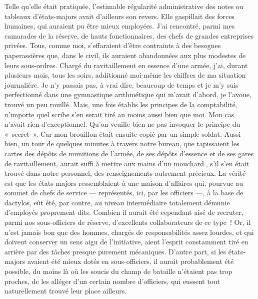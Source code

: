 \documentclass[french,twoside]{book} %
\begin{document}
Telle qu’elle était pratiquée, l’estimable régularité administrative des notes ou tableaux d’états-majors avait d’ailleurs son revers. Elle gaspillait des forces humaines, qui auraient pu être mieux employées. J’ai rencontré, parmi mes camarades de la réserve, de hauts fonctionnaires, des chefs de grandes entreprises privées. Tous, comme moi, s’effaraient d’être contraints à des besognes paperassières que, dans le civil, ils auraient abandonnées aux plus modestes de leurs sous-ordres. Chargé du ravitaillement en essence d’une armée, j’ai, durant plusieurs mois, tous les soirs, additionné moi-même les chiffres de ma situation journalière. Je n’y passais pas, à vrai dire, beaucoup de temps et je m’y suis perfectionné dans une gymnastique arithmétique qui m’avait d’abord, je l’avoue, trouvé un peu rouillé. Mais, une fois établis les principes de la comptabilité, n’importe quel scribe s’en serait tiré au moins aussi bien que moi. Mon cas n’avait rien d’exceptionnel. Qu’on veuille bien ne pas invoquer le principe du « secret ». Car mon brouillon était ensuite copié par un simple soldat. Aussi bien, un tour de quelques minutes à travers notre bureau, que tapissaient les cartes des dépôts de munitions de l’armée, de ses dépôts d’essence et de ses gares de ravitaillement, aurait suffi à mettre aux mains d’un mouchard., s’il s’en était trouvé dans notre personnel, des renseignements   autrement précieux. La vérité est que les états-majors ressemblaient à une maison d’affaires qui, pourvue au sommet de chefs de service — représentés, ici, par les officiers —, à la base de dactylos, eût été, par contre, au niveau intermédiaire totalement démunie d’employés proprement dits. Combien il aurait été cependant aisé de recruter, parmi nos sous-officiers de réserve, d’excellents collaborateurs de ce type ! Or, il n’est jamais bon que des hommes, chargés de responsabilités assez lourdes, et qui doivent conserver un sens aigu de l’initiative, aient l’esprit constamment tiré en arrière par des tâches presque purement mécaniques. D’autre part, si les états-majors avaient été mieux dotés en sous-officiers, il aurait probablement été possible, du moins là où les soucis du champ de bataille n’étaient pas trop proches, de les alléger d’un certain nombre d’officiers, qui eussent tout naturellement trouvé leur place ailleurs.\par
\end{document}
